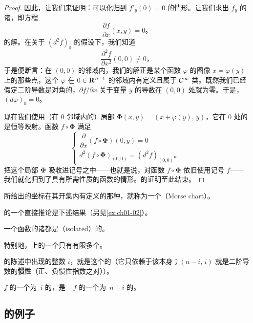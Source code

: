 \begin{proof}
因此，让我们来证明：可以化归到 $f'_y(0)=0$ 的情形。让我们求出 $f_y$ 的诸\trCriticalPoint，即方程
\[
\frac{\partial f}{\partial x}(x,y)=0\text{。}
\]
的解。在关于 $(d^2f)_0$ 的假设下，我们知道
\[
\frac{\partial^2 f}{\partial x^2}(0,0)\neq 0\text{，}
\]
于是\trImplicitFunctionTheorem{}便断言：在 $(0,0)$ 的邻域内，我们的解正是某个函数 $\varphi$ 的图像 $x=\varphi(y)$ 上的那些点，这个 $\varphi$ 在 $0\in\mathbf{R}^{n-1}$ 的邻域内有定义且属于 $\mathcal{C}^\infty$ 类。既然我们已经假定二阶导数是对角的，$\partial f/\partial x$ 关于变量 $y$ 的导数在 $(0,0)$ 处就为零。于是，$(d\varphi)_0=0$。

现在我们使用（在 $0$ 邻域内的）局部\trDiffeomorphism{} $\boldsymbol{\Phi}(x,y)=(x+\varphi(y),\,y)$，它在 $0$ 处的\trDifferential{}是恒等映射。函数 $f\circ\boldsymbol{\Phi}$ 满足
\[
\left\{
\begin{array}{l}
\dfrac{\partial}{\partial x}(f\circ\boldsymbol{\Phi})(0,y)=0\\[2ex]
d^2(f\circ\boldsymbol{\Phi})_{(0,0)}=(d^2f)_{(0,0)}\text{。}
\end{array}
\right.
\]
把这个局部\trDiffeomorphism{} $\boldsymbol{\Phi}$ 吸收进记号之中——也就是说，对函数 $f\circ\boldsymbol{\Phi}$ 依旧使用记号 $f$——我们就化归到了具有所需性质的函数的情形。\trMorseLemma{}的证明至此结束。
\end{proof}

\trMorseLemma{}所给出的坐标在其开集内有定义的那种\trChart，就称为一个\textbf{\trMorseChart}（Morse chart）。

\trMorseLemma{}的一个直接推论是下述结果（另见\cref{ex:ch01-02}）。

\begin{corollary}\label{thm:nondegenerate-critical-isolated}
一个函数的诸\trNondegenerate\trCriticalPoint{}都是\textbf{\trIsolated}（isolated）{}的。\noqed
\end{corollary}

特别地，\trCompact\trManifold{}上的一个\trMorseFunction{}只有有限多个\trCriticalPoint。

\trMorseLemma{}的陈述中出现的整数 $i$，就是这个\trCriticalPoint{}的\trIndex（它只依赖于该\trCriticalPoint{}本身；$(n-i,\,i)$ 就是二阶导数\trQuadraticForm{}的\textbf{惯性\trIndex}（正、负惯性指数之对））。

\begin{remark}\label{thm:index-of-minus-f}
$f$ 的一个\trIndex{}为~$i$ 的\trCriticalPoint，是 $-f$ 的一个\trIndex{}为~$n-i$ 的\trCriticalPoint。
\end{remark}

\subsection{\trCriticalPoint{}的例子}
\label{subsec:examples-of-critical-points}

